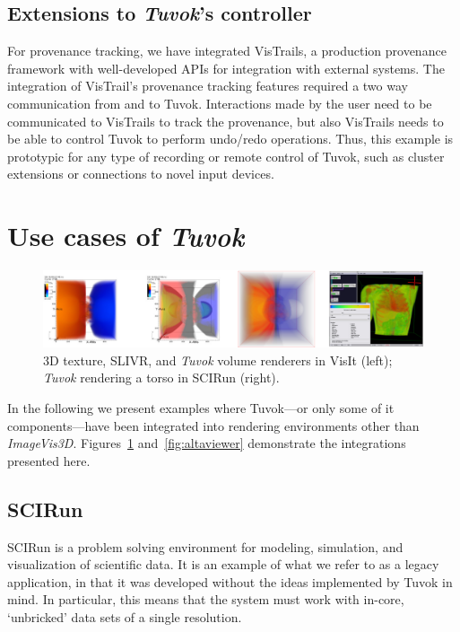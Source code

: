 \subsection{Extensions to \textit{Tuvok}'s controller}

For provenance tracking, we have integrated VisTrails, a production
provenance framework with well-developed APIs
for integration with external systems. The integration of
VisTrail’s provenance tracking features required a two way
communication from and to Tuvok. Interactions made by
the user need to be communicated to VisTrails to track the
provenance, but also VisTrails needs to be able to control Tuvok
to perform undo/redo operations. Thus, this example is
prototypic for any type of recording or remote control of Tuvok,
such as cluster extensions or connections to novel input
devices.

\section{Use cases of \textit{Tuvok}}
\label{sec:tvk-uses}

\begin{figure}
	\includegraphics[width=\linewidth]{images/arch/integration}

  \caption{3D texture, SLIVR, and \textit{Tuvok} volume renderers in
  VisIt (left); \textit{Tuvok} rendering a torso in SCIRun (right).}
	\label{fig:integration}
\end{figure}

In the following we present examples where Tuvok---or only some of it
components---have been integrated into rendering environments other
than
\textit{ImageVis3D}. Figures~\ref{fig:integration}
and~\ref{fig:altaviewer} demonstrate the integrations presented here.

\subsection{SCIRun}

SCIRun is a problem solving environment for modeling,
simulation, and visualization of scientific data. It is an example
of what we refer to as a legacy application, in that it
was developed without the ideas implemented by Tuvok in
mind. In particular, this means that the system must work
with in-core, `unbricked' data sets of a single resolution.

